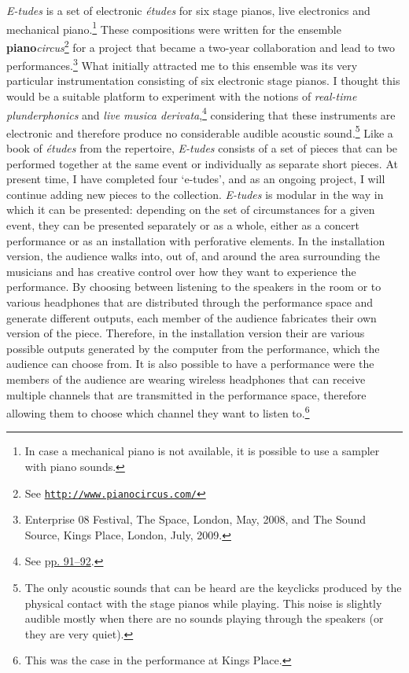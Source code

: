 \emph{E-tudes} is a set of electronic \emph{\'{e}tudes} for six stage pianos, live electronics and mechanical piano.\footnote{In case a mechanical piano is not available, it is possible to use a sampler with piano sounds.} These compositions were written for the ensemble \textbf{piano}\emph{circus}\footnote{See \href{http://www.pianocircus.com/}{\texttt{http://www.pianocircus.com/}}} for a project that became a \mbox{two-year} collaboration and lead to two performances.\footnote{Enterprise 08 Festival, The Space, London, May, 2008, and The Sound Source, Kings Place, London, July, 2009.} What initially attracted me to this ensemble was its very particular instrumentation consisting of six electronic stage pianos. I thought this would be a suitable platform to experiment with the notions of \emph{real-time plunderphonics} and \emph{live musica derivata},\footnote{See \hyperlink{realtimeplunderfuck}{pp. 91--92}.} considering that these instruments are electronic and therefore produce no considerable audible acoustic sound.\footnote{The only acoustic sounds that can be heard are the keyclicks produced by the physical contact with the stage pianos while playing. This noise is slightly audible mostly when there are no sounds playing through the speakers (or they are very quiet).} Like a book of \emph{\'{e}tudes} from the repertoire, \emph{E-tudes} consists of a set of pieces that can be performed together at the same event or individually as separate short pieces. At present time, I have completed four `e-tudes', and as an ongoing project, I will continue adding new pieces to the collection. \emph{E-tudes} is modular in the way in which it can be presented: depending on the set of circumstances for a given event, they can be presented separately or as a whole, either as a concert performance or as an installation with perforative elements. In the installation version, the audience walks into, out of, and around the area surrounding the musicians and has creative control over how they want to experience the performance. By choosing between listening to the speakers in the room or to various headphones that are distributed through the performance space and generate different outputs, each member of the audience fabricates their own version of the piece. Therefore, in the installation version their are various possible outputs generated by the computer from the performance, which the audience can choose from. It is also possible to have a performance were the members of the audience are wearing wireless headphones that can receive multiple channels that are transmitted in the performance space, therefore allowing them to choose which channel they want to listen to.\footnote{This was the case in the performance at Kings Place.}

